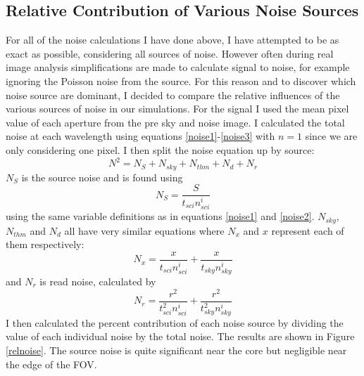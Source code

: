 \documentclass[11pt,twoside]{article}
\begin{document}
\subsection{Relative Contribution of Various Noise Sources}
For all of the noise calculations I have done above, I have attempted to be as exact as possible, considering all sources of noise. However often during real image analysis simplifications are made to calculate signal to noise, for example ignoring the Poisson noise from the source. For this reason and to discover which noise source are dominant, I decided to compare the relative influences of the various sources of noise in our simulations. For the signal I used the mean pixel value of each aperture from the pre sky and noise image. I calculated the total noise at each wavelength using equations \ref{noise1}-\ref{noise3} with $n=1$ since we are only considering one pixel. I then split the noise equation up by source: \begin{equation} N^2=N_S+N_{sky}+N_{thm}+N_d+N_r \end{equation}
$N_S$ is the source noise and is found using \begin{equation} N_S=\frac{S}{t_{sci}n^i_{sci}}\end{equation} using the same variable definitions as in equations \ref{noise1} and \ref{noise2}. $N_{sky}$, $N_{thm}$ and $N_d$ all have very similar equations where $N_x$ and $x$ represent each of them respectively: \begin{equation} N_x=\frac{x}{t_{sci}n^i_{sci}}+\frac{x}{t_{sky}n^i_{sky}} \end{equation} and $N_r$ is read noise, calculated by \begin{equation} N_r= \frac{r^2}{t_{sci}^2n^i_{sci}}+\frac{r^2}{t_{sky}^2n^i_{sky}} \end{equation} I then calculated the percent contribution of each noise source by dividing the value of each individual noise by the total noise. The results are shown in Figure \ref{relnoise}. The source noise is quite significant near the core but negligible near the edge of the FOV.
\end{document}
